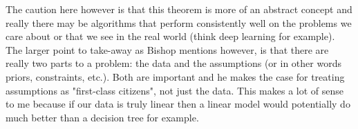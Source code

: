 The caution here however is that this theorem is more of an abstract concept and really there may be algorithms that perform consistently well on the problems we care about or that we see in the real world (think deep learning for example). The larger point to take-away as Bishop mentions however, is that there are really two parts to a problem: the data and the assumptions (or in other words priors, constraints, etc.). Both are important  and he makes the case for treating assumptions as "first-class citizens", not just the data. This makes a lot of sense to me because if our data is truly linear then a linear model would potentially do much better than a decision tree for example.


\newpage

